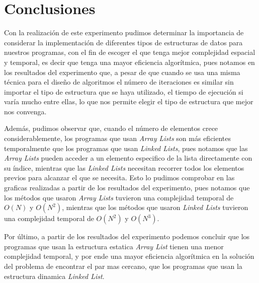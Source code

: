 \section{Conclusiones}
Con la realización de este experimento pudimos determinar la importancia de considerar la implementación de diferentes tipos de estructuras de datos para nuestros programas, con el fin de escoger el que tenga mejor complejidad espacial y temporal, es decir que tenga una mayor eficiencia algorítmica, pues notamos en los resultados del experimento que, a pesar de que cuando se usa una misma técnica para el diseño de algoritmos el número  de iteraciones es similar sin importar el tipo de estructura que se haya utilizado, el tiempo de ejecución si varía mucho entre ellas, lo que nos permite elegir el tipo de estructura que mejor nos convenga.

Además, pudimos observar que, cuando el número de elementos crece considerablemente, los programas que usan \textit{Array Lists} son más eficientes temporalmente que los programas que usan \textit{Linked Lists}, pues notamos que las \textit{Array Lists} pueden acceder a un elemento especifico de la lista directamente con su índice, mientras que las \textit{Linked Lists} necesitan recorrer todos los elementos previos para alcanzar el que se necesita. Esto lo pudimos comprobar en las graficas realizadas a partir de los resultados del experimento, pues notamos que los métodos que usaron \textit{Array Lists} tuvieron una complejidad temporal de $O(N)$ y $O(N^2)$, mientras que los métodos que usaron \textit{Linked Lists} tuvieron una complejidad temporal de $O(N^2)$ y $O(N^3)$.

Por último, a partir de los resultados del experimento podemos concluir que los programas que usan la estructura estatica \textit{Array List} tienen una menor complejidad temporal, y por ende una mayor eficiencia algorítmica en la solución del problema de encontrar el par mas cercano, que los programas que usan la estructura dinamica \textit{Linked List}.
